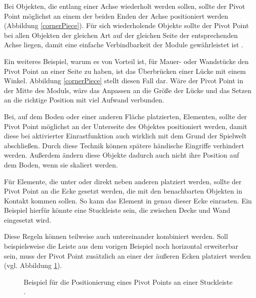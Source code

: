 \par
Bei Objekten, die entlang einer Achse wiederholt werden sollen, sollte der Pivot Point möglichst an einem der beiden Enden der Achse positioniert werden (Abbildung \ref{cornerPiece}). \parencite{Mader}
\enlargethispage{10.5pt}
\newpage
Für sich wiederholende Objekte sollte der Pivot Point bei allen Objekten der gleichen Art auf der gleichen Seite der entsprechenden Achse liegen, damit eine einfache Verbindbarkeit der Module gewährleistet ist \parencite{Mader}.
\par
Ein weiteres Beispiel, warum es von Vorteil ist, für Mauer- oder Wandstücke den Pivot Point an einer Seite zu haben, ist das Überbrücken einer Lücke mit einem Winkel. Abbildung \ref{cornerPiece} stellt diesen Fall dar. Wäre der Pivot Point in der Mitte des Moduls, wäre das Anpassen an die Größe der Lücke und das Setzen an die richtige Position mit viel Aufwand verbunden. \parencite{Perry}
\par
Bei, auf dem Boden oder einer anderen Fläche platzierten, Elementen, sollte der Pivot Point möglichst an der Unterseite des Objektes positioniert werden, damit diese bei aktivierter Einrastfunktion auch wirklich mit dem Grund der Spielwelt abschließen. Durch diese Technik können spätere händische Eingriffe verhindert werden. Außerdem ändern diese Objekte dadurch auch nicht ihre Position auf dem Boden, wenn sie skaliert werden. \parencite{Mader}
\par
Für Elemente, die unter oder direkt neben anderen platziert werden, sollte der Pivot Point an die Ecke gesetzt werden, die mit den benachbarten Objekten in Kontakt kommen sollen. So kann das Element in genau dieser Ecke einrasten. Ein Beispiel hierfür könnte eine Stuckleiste sein, die zwischen Decke und Wand eingesetzt wird. \parencite{Meler}
\par
Diese Regeln können teilweise auch untereinander kombiniert werden. Soll beispielsweise die Leiste aus dem vorigen Beispiel noch horizontal erweiterbar sein, muss der Pivot Point zusätzlich an einer der äußeren Ecken platziert werden (vgl. Abbildung \ref{stuck}). \parencite{Meler}
\begin{figure}[H]
\centering
  \caption{Beispiel für die Positionierung eines Pivot Points an einer Stuckleiste \parencite{Mader}.}
	\label{stuck}
\end{figure}
